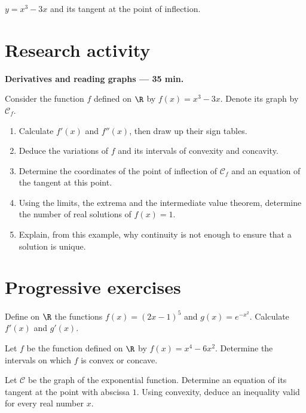 \begin{center}\par\small $y=x^3-3x$ and its tangent at the point of inflection.\end{center}

\mxnewpage
\section{Research activity}\textbf{Derivatives and reading graphs --- 35 min.}\par Consider the function $f$ defined on $\R$ by $f(x)=x^3-3x$. Denote its graph by $\mathcal C_f$.
\begin{enumerate}\item Calculate $f' (x)$ and $f'' (x)$, then draw up their sign tables.
\item Deduce the variations of $f$ and its intervals of convexity and concavity.
\item Determine the coordinates of the point of inflection of $\mathcal C_f$ and an equation of the tangent at this point.
\item Using the limits, the extrema and the intermediate value theorem, determine the number of real solutions of $f(x)=1$.
\item Explain, from this example, why continuity is not enough to ensure that a solution is unique.\end{enumerate}

\mxnewpage
\section{Progressive exercises}

Define on $\R$ the functions $f(x)=(2x-1)^5$ and $g(x)=e^{-x^2}$. Calculate $f' (x)$ and $g' (x)$.

Let $f$ be the function defined on $\R$ by $f(x)=x^4-6x^2$. Determine the intervals on which $f$ is convex or concave.

Let $\mathcal C$ be the graph of the exponential function. Determine an equation of its tangent at the point with abscissa $1$. Using convexity, deduce an inequality valid for every real number $x$.

